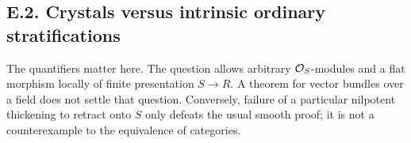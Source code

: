 \subsection{E.2. Crystals versus intrinsic ordinary stratifications}

The quantifiers matter here.  The question allows arbitrary $\mathcal O_S$-modules and a flat morphism locally of finite presentation $S\to R$.  A theorem for vector bundles over a field does not settle that question.  Conversely, failure of a particular nilpotent thickening to retract onto $S$ only defeats the usual smooth proof; it is not a counterexample to the equivalence of categories.

